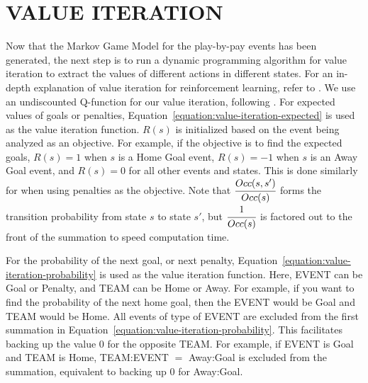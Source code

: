 \documentclass[]{article}
\begin{document}
\begin{table}[htb]
\caption{Size of Markov Decision Process Graph}
\label{table:size-of-mdp}
\begin{center}
\end{center}
\end{table}



\section{VALUE ITERATION}
\label{subsec:value-iteration-alg}

Now that the Markov Game Model for the play-by-pay events has been generated, the next step is to run a dynamic programming algorithm for value iteration to extract the values of different actions in different states. For an in-depth explanation of value iteration for reinforcement learning, refer to \citep{Mitchell1997}. We use an undiscounted Q-function for our value iteration, following \citep{Schwartz1993}. For expected values of goals or penalties, Equation~\ref{equation:value-iteration-expected} is used as the value iteration function. $R(s)$ is initialized based on the event being analyzed as an objective. For example, if the objective is to find the expected goals, $R(s) = 1$ when $s$ is a Home Goal event, $R(s) = -1$ when $s$ is an Away Goal event, and $R(s) = 0$ for all other events and states. This is done similarly for when using penalties as the objective. Note that $\cfrac{Occ(s,s')}{Occ(s)}$ forms the transition probability from state $s$ to state $s'$, but $\cfrac{1}{Occ(s)}$ is factored out to the front of the summation to speed computation time.

For the probability of the next goal, or next penalty, Equation~\ref{equation:value-iteration-probability} is used as the value iteration function. Here, EVENT can be Goal or Penalty, and TEAM can be Home or Away. For example, if you want to find the probability of the next home goal, then the EVENT would be Goal and TEAM would be Home. All events of type of EVENT are excluded from the first summation in Equation~\ref{equation:value-iteration-probability}. This facilitates backing up the value $0$ for the opposite TEAM. For example, if EVENT is Goal and TEAM is Home, TEAM:EVENT $=$ Away:Goal is excluded from the summation, equivalent to backing up $0$ for Away:Goal.
\end{document}
